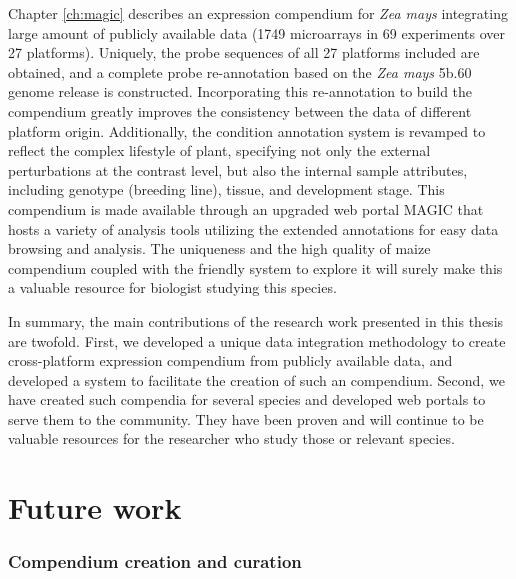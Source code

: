 Chapter \ref{ch:magic} describes an expression compendium for \textit{Zea mays} 
integrating large amount of publicly available data (1749 microarrays in 69 
experiments over 27 platforms). 
%
Uniquely, the probe sequences of all 27 platforms included are obtained, and a 
complete probe re-annotation based on the \textit{Zea mays} 5b.60 genome 
release 
is constructed.  Incorporating this re-annotation to build the compendium 
greatly improves the consistency between the data of different platform origin.
%
Additionally, the condition annotation system is revamped to reflect the 
complex lifestyle of plant, specifying not only the external perturbations 
at the contrast level, but also the internal sample attributes, including 
genotype (breeding line), tissue, and development stage.
%
This compendium is made available through an upgraded web portal MAGIC that 
hosts a variety of analysis tools utilizing the extended annotations for 
easy data browsing and analysis.
%
The uniqueness and the high quality of maize compendium coupled with the 
friendly system to explore it will surely make this a valuable resource for 
biologist studying this species.


In summary, the main contributions of the research work presented in this 
thesis are twofold.
%
First, we developed a unique data integration methodology to create 
cross-platform expression compendium from publicly available data, and 
developed a system to facilitate the creation of such an compendium.
%
Second, we have created such compendia for several species and developed web 
portals to serve them to the community.  They have been proven and will 
continue to be valuable resources for the researcher who study those or 
relevant species.














\section{Future work}



\subsubsection*{Compendium creation and curation}


